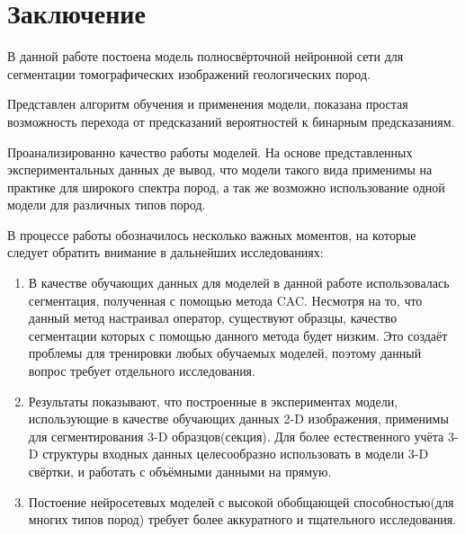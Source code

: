 \documentclass[12pt, a4paper]{extarticle}
\begin{document}
\clearpage

\newpage


\section{Заключение} \label{conclusion}

В данной работе постоена модель полносвёрточной нейронной сети для сегментации томографических изображений геологических пород.

Представлен алгоритм обучения и применения модели, показана простая возможность перехода от предсказаний вероятностей к бинарным предсказаниям. 

Проанализированно качество работы моделей. На основе представленных  экспериментальных данных де вывод, что модели такого вида применимы на практике для широкого спектра пород, а так же возможно использование одной модели для различных типов пород.

В процессе работы обозначилось несколько важных моментов, на которые следует обратить внимание в дальнейших исследованиях:

\begin{enumerate}

	\item В качестве обучающих данных для моделей в данной работе использовалась сегментация, полученная с помощью метода CAC. Несмотря на то, что данный метод настраивал оператор, существуют образцы, качество сегментации которых с помощью данного метода будет  низким. Это создаёт проблемы для тренировки любых обучаемых моделей, поэтому данный вопрос требует отдельного исследования. 

	\item Результаты показывают, что построенные в экспериментах модели, использующие в качестве обучающих данных 2-D изображения, применимы для сегментирования 3-D образцов(секция). Для более естественного учёта 3-D структуры входных данных целесообразно использовать в модели 3-D свёртки, и работать с объёмными данными на прямую. 
	
	\item Постоение нейросетевых моделей с высокой обобщающей способностью(для многих типов пород) требует более аккуратного и тщательного исследования. 

\end{enumerate}

\newpage

\cleardoublepage
{}
\end{document}
